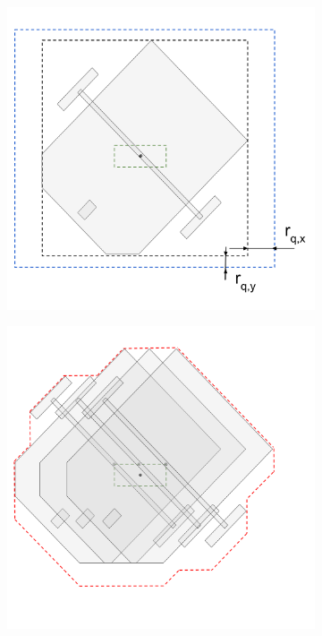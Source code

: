 \begin{figure}[htp]
    \centering
    \begin{subfigure}{0.4\textwidth}
        \centering
        \includegraphics[width=\linewidth]{figures/samp/CC2.png}
        \caption{}
        \label{fig:CC1}
    \end{subfigure}
    \begin{subfigure}{0.4\textwidth}
        \centering
        \includegraphics[width=\linewidth]{figures/samp/CC3.png}
        \caption{}
        \label{fig:CC2}
    \end{subfigure}
    

\end{figure}
